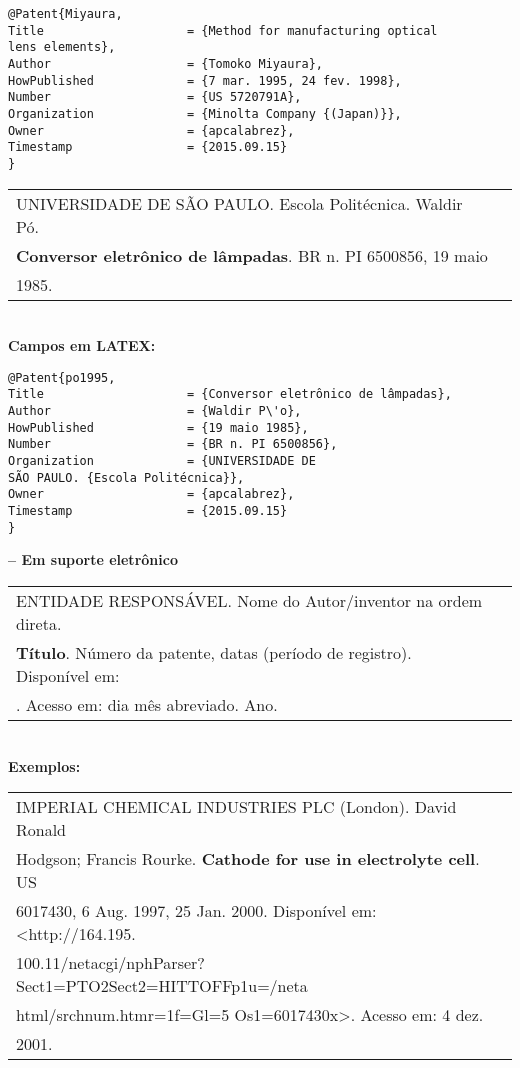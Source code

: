 \begin{verbatim}
@Patent{Miyaura,
Title                    = {Method for manufacturing optical 
lens elements},
Author                   = {Tomoko Miyaura},
HowPublished             = {7 mar. 1995, 24 fev. 1998},
Number                   = {US 5720791A},
Organization             = {Minolta Company {(Japan)}},
Owner                    = {apcalabrez},
Timestamp                = {2015.09.15}
}
\end{verbatim}

\begin{tabular}{|l|c|} \hline
UNIVERSIDADE DE SÃO PAULO. Escola Politécnica. Waldir Pó.\\
\textbf{Conversor eletrônico de lâmpadas}. BR n. PI 6500856, 19 maio \\1985. 
	\\\hline
\end{tabular} \\

\textbf{Campos em LATEX:} 

\begin{verbatim}
@Patent{po1995,
Title                    = {Conversor eletrônico de lâmpadas},
Author                   = {Waldir P\'o},
HowPublished             = {19 maio 1985},
Number                   = {BR n. PI 6500856},
Organization             = {UNIVERSIDADE DE 
SÃO PAULO. {Escola Politécnica}},
Owner                    = {apcalabrez},
Timestamp                = {2015.09.15}
}
\end{verbatim}

\textbf{-- Em suporte eletrônico } \\

\begin{tabular}{|l|c|} \hline
ENTIDADE RESPONSÁVEL. Nome do Autor/inventor na ordem direta. \\\textbf{Título}. Número da patente, datas (período de registro). Disponível em: \\<endereço eletrônico>. Acesso em: dia mês abreviado. Ano. 
	\\\hline
\end{tabular} \\

\textbf{Exemplos:} \\

\begin{tabular}{|l|c|} \hline
IMPERIAL CHEMICAL INDUSTRIES PLC (London). David Ronald \\Hodgson; Francis Rourke. \textbf{Cathode for use in electrolyte cell}. US \\6017430, 6 Aug. 1997, 25 Jan. 2000. Disponível em:
<http://164.195.\\100.11/netacgi/nphParser?Sect1=PTO2Sect2=HITTOFFp1u=/neta\\html/srchnum.htmr=1f=Gl=5 Os1=6017430x>. Acesso em: 4 dez. \\2001. 
	\\\hline
\end{tabular} \\

